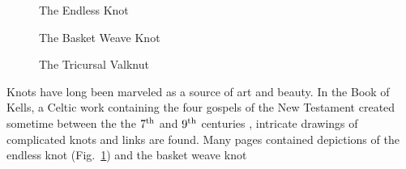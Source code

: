 \begin{figure}
    \centering
    \caption{The Endless Knot}
    \label{fig:endless_knot_celtic_style}
\end{figure}
\begin{figure}
    \centering
    \caption{The Basket Weave Knot}
    \label{fig:basket_weave_knot_celtic_style}
\end{figure}
\begin{figure}
    \centering
    \caption{The Tricursal Valknut}
    \label{fig:borromean_rings_tricursal_valknut}
\end{figure}
Knots have long been marveled as a source of art and beauty. In the Book of
Kells, a Celtic work containing the four gospels of the New Testament created
sometime between the the $7^{\small\textrm{th}}$ and $9^{\small\textrm{th}}$
centuries \cite[p.~108]{Nordenfalk1977}, intricate drawings of complicated
knots and links are found. Many pages contained depictions of the endless knot
(Fig.~\ref{fig:endless_knot_celtic_style}) and the basket weave knot
